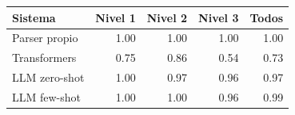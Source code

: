 \begin{tabular}{lrrrr}
\toprule
Sistema & Nivel 1 & Nivel 2 & Nivel 3 & Todos \\
\midrule
Parser propio & 1.00 & 1.00 & 1.00 & 1.00 \\
Transformers & 0.75 & 0.86 & 0.54 & 0.73 \\
LLM zero-shot & 1.00 & 0.97 & 0.96 & 0.97 \\
LLM few-shot & 1.00 & 1.00 & 0.96 & 0.99 \\
\bottomrule
\end{tabular}
